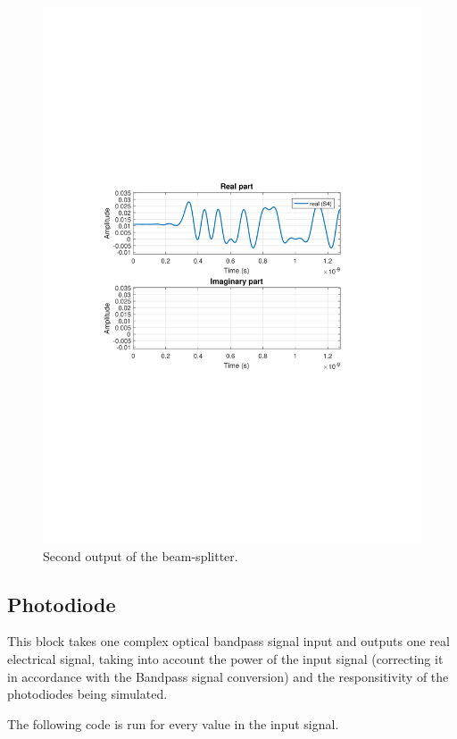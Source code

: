 \documentclass{article}
\begin{document}
\begin{figure}[H]
\centering
\includegraphics[width=\linewidth, trim= 0mm 100mm 0mm 100mm, clip]{bs2.pdf}
\caption{Second output of the beam-splitter.}
\label{fig:bsout2}
\end{figure}

\subsection{Photodiode}

This block takes one complex optical bandpass signal input and outputs one real electrical signal, taking into account the power of the input signal (correcting it in accordance with the Bandpass signal conversion) and the responsitivity of the photodiodes being simulated.
\par
The following code is run for every value in the input signal.
\end{document}
